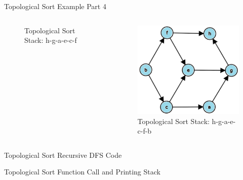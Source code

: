 \documentclass[aspectratio=169]{beamer}%
\begin{document}
\begin{frame}{Topological Sort Example Part 4}
\begin{columns}
\begin{column}{.32\textwidth}
\begin{figure}
                \caption{Topological Sort Stack: h-g-a-e-c-f}
            \end{figure}
        \end{column}
        \hfill
        \begin{column}{.32\textwidth}
            \begin{figure}
                \centering
                \includegraphics[width = .9\linewidth]{topsort12.png}
                \caption{Topological Sort Stack: h-g-a-e-c-f-b}
            \end{figure}
        \end{column}
    \end{columns}
\end{frame}

\begin{frame}{Topological Sort Recursive DFS Code}
    
\end{frame}

\begin{frame}{Topological Sort Function Call and Printing Stack}
    
\end{frame}
\end{document}

